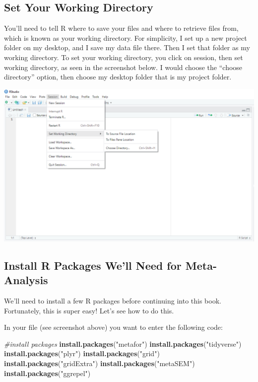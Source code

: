 \documentclass[
]{book}
\newenvironment{Shaded}{\begin{snugshade}}{\end{snugshade}}
\newcommand{\CommentTok}[1]{\textcolor[rgb]{0.56,0.35,0.01}{\textit{#1}}}
\newcommand{\FunctionTok}[1]{\textcolor[rgb]{0.13,0.29,0.53}{\textbf{#1}}}
\newcommand{\NormalTok}[1]{#1}
\newcommand{\StringTok}[1]{\textcolor[rgb]{0.31,0.60,0.02}{#1}}
\begin{document}
\hypertarget{set-your-working-directory}{%
\subsection{Set Your Working Directory}\label{set-your-working-directory}}

You'll need to tell R where to save your files and where to retrieve files from, which is known as your working directory. For simplicity, I set up a new project folder on my desktop, and I save my data file there. Then I set that folder as my working directory. To set your working directory, you click on session, then set working directory, as seen in the screenshot below. I would choose the ``choose directory'' option, then choose my desktop folder that is my project folder.

\includegraphics[width=1\textwidth,height=\textheight]{images/workingdirectory.PNG}

\hypertarget{install-r-packages-well-need-for-meta-analysis}{%
\subsection{Install R Packages We'll Need for Meta-Analysis}\label{install-r-packages-well-need-for-meta-analysis}}

We'll need to install a few R packages before continuing into this book. Fortunately, this is super easy! Let's see how to do this.

In your file (see screenshot above) you want to enter the following code:

\begin{Shaded}
\begin{Highlighting}[]
\CommentTok{\#install packages}
\FunctionTok{install.packages}\NormalTok{(}\StringTok{"metafor"}\NormalTok{)}
\FunctionTok{install.packages}\NormalTok{(}\StringTok{"tidyverse"}\NormalTok{)}
\FunctionTok{install.packages}\NormalTok{(}\StringTok{"plyr"}\NormalTok{)}
\FunctionTok{install.packages}\NormalTok{(}\StringTok{"grid"}\NormalTok{)}
\FunctionTok{install.packages}\NormalTok{(}\StringTok{"gridExtra"}\NormalTok{)}
\FunctionTok{install.packages}\NormalTok{(}\StringTok{"metaSEM"}\NormalTok{)}
\FunctionTok{install.packages}\NormalTok{(}\StringTok{"ggrepel"}\NormalTok{)}
\end{Highlighting}
\end{Shaded}
\end{document}
